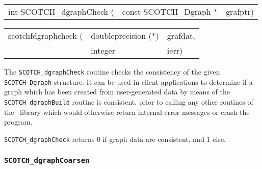 \begin{itemize}
\progsyn

{\tt\begin{tabular}{l@{}ll}
int SCOTCH\_dgraphCheck ( & const SCOTCH\_Dgraph * & grafptr)
\end{tabular}}

{\tt\begin{tabular}{l@{}ll}
scotchfdgraphcheck ( & doubleprecision (*) & grafdat, \\
                     & integer             & ierr)
\end{tabular}}

\progdes

The {\tt SCOTCH\_dgraphCheck} routine checks the consistency of the
given {\tt SCOTCH\_\lbt Dgraph} structure. It can be used in client
applications to determine if a graph which has been created from
user-generated data by means of the {\tt SCOTCH\_\lbt dgraph\lbt Build}
routine is consistent, prior to calling any other routines of the
\libscotch\ library which would otherwise return internal error
messages or crash the program.

\progret

{\tt SCOTCH\_dgraphCheck} returns $0$ if graph data are consistent, and
$1$ else.

\end{itemize}

\subsubsection{{\tt SCOTCH\_dgraphCoarsen}}
\label{sec-lib-func-scotchdgraphcoarsen}

